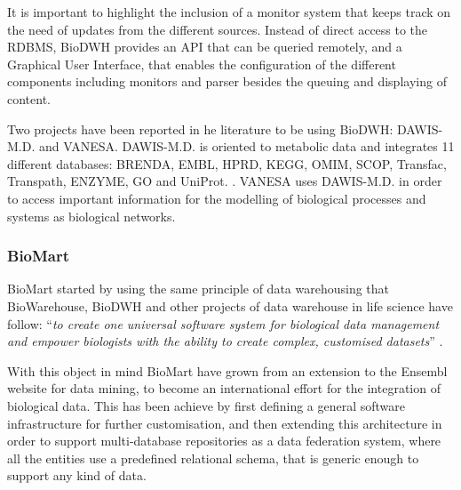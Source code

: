 It is important to highlight the inclusion of a monitor system that keeps track on the need of updates from the different sources. Instead of direct access to the RDBMS, BioDWH provides an API that can be queried remotely, and a Graphical User Interface, that enables the configuration of the different components including monitors and parser besides the queuing and displaying of content.

Two projects have been reported in he literature to be using BioDWH: DAWIS-M.D. and VANESA. DAWIS-M.D. is oriented to metabolic data and integrates 11 different databases: BRENDA, EMBL, HPRD, KEGG, OMIM, SCOP, Transfac, Transpath, ENZYME, GO and UniProt. \cite{HIP2010}. VANESA uses DAWIS-M.D. in order to access important information for the modelling of biological processes and systems as biological networks\cite{BRI2014}.

\subsubsection{BioMart}
BioMart started by using the same principle of data warehousing that BioWarehouse, BioDWH and other projects of data warehouse in life science have follow: ``\emph{to create one universal software system for biological data management and empower biologists with the ability to create complex, customised datasets}'' \cite{KAS2011}.

With this object in mind BioMart have grown from an extension to the Ensembl website for data mining, to become an international effort for the integration of biological data. This has been achieve by first defining a general software infrastructure for further customisation, and then extending this architecture in order to support multi-database repositories as a data federation system, where all the entities use a predefined relational schema, that is generic enough to support any kind of data.

